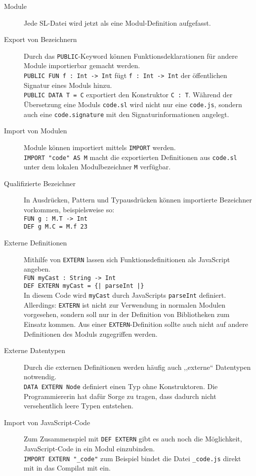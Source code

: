 \documentclass[runningheads]{llncs}
\begin{document}
\begin{description}
 \item[Module] Jede SL-Datei wird jetzt als eine Modul-Definition aufgefasst.
 \item[Export von Bezeichnern] Durch das \verb|PUBLIC|-Keyword können
   Funktionsdeklarationen für andere Module importierbar gemacht werden. \\
   \verb|PUBLIC FUN f : Int -> Int| \quad fügt \verb|f : Int -> Int|
   der öffentlichen Signatur eines Moduls hinzu.\\
   \verb|PUBLIC DATA T = C| \quad exportiert den Konstruktor \verb|C : T|.
   Während der Übersetzung eine Moduls \verb|code.sl| wird nicht nur eine
   \verb|code.js|, sondern auch eine \verb|code.signature| mit den
   Signaturinformationen angelegt. 
 \item[Import von Modulen] Module können importiert mittels \verb|IMPORT|
   werden. \\
   \verb|IMPORT "code" AS M| \quad macht die exportierten Definitionen aus
   \verb|code.sl| unter dem lokalen Modulbezeichner \verb|M| verfügbar. 
 \item[Qualifizierte Bezeichner] In Ausdrücken, Pattern und Typausdrücken
   können importierte Bezeichner vorkommen, beispielsweise so:\\
   \verb|FUN g : M.T -> Int|\\
   \verb|DEF g M.C = M.f 23|
 \item[Externe Definitionen] Mithilfe von \verb|EXTERN| lassen sich
   Funktionsdefinitionen als JavaScript angeben.\\
   \verb|FUN myCast : String -> Int|\\
   \verb.DEF EXTERN myCast = {| parseInt |}.\\
   In diesem Code wird \verb|myCast| durch JavaScripts \verb|parseInt|
   definiert. Allerdings: \verb|EXTERN| ist nicht zur Verwendung in normalen
   Modulen vorgesehen, sondern soll nur in der Definition von Bibliotheken
   zum Einsatz kommen. Aus einer \verb|EXTERN|-Definition sollte auch nicht
   auf andere Definitionen des Moduls zugegriffen werden.
 \item[Externe Datentypen] Durch die externen Definitionen werden häufig
   auch ,,externe`` Datentypen notwendig.\\
   \verb|DATA EXTERN Node| \quad definiert einen Typ ohne Konstruktoren.
   Die Programmiererin hat dafür Sorge zu tragen, dass dadurch nicht
   versehentlich leere Typen entstehen.
 \item[Import von JavaScript-Code] Zum Zusammenspiel mit \verb|DEF EXTERN|
   gibt es auch noch die Möglichkeit, JavaScript-Code in ein Modul
   einzubinden.\\
   \verb|IMPORT EXTERN "_code"| \quad zum Beispiel bindet die Datei
   \verb|_code.js| direkt mit in das Compilat mit ein.
\end{description}
\end{document}
